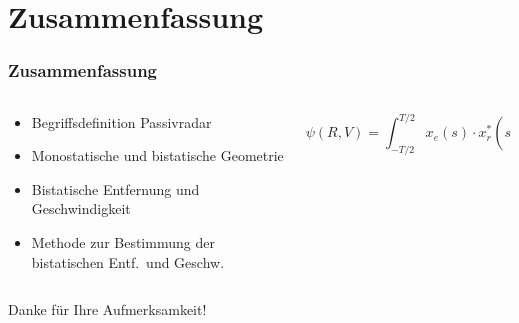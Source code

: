 \section{Zusammenfassung}

\begin{frame}
    \frametitle{Zusammenfassung}

    \begin{columns}
        \begin{column}{0.4\textwidth}
            \begin{itemize}
                \item Begriffsdefinition Passivradar
                \item Monostatische und bistatische Geometrie
                \item Bistatische Entfernung und Geschwindigkeit
                \item Methode zur Bestimmung der bistatischen Entf.\ und Geschw.
            \end{itemize}
        \end{column}
        \begin{column}{0.6\textwidth}
            \centering
            \begin{adjustbox}{max width=\linewidth,max height=0.3\textheight}
            \end{adjustbox}
            \begin{adjustbox}{max width=\linewidth,max height=0.3\textheight}
            \end{adjustbox}
            \begin{adjustbox}{max width=\linewidth,max height=0.25\textheight}
                \begin{tikzpicture}
                    
                \end{tikzpicture}
            \end{adjustbox}
            \tiny\begin{equation}
                \psi(R, V) = \int_{-T/2}^{T/2} {x_{e}(s) \cdot x_{r}^{*}} \left( s - \frac{R}{c} \right)\mathrm{e}^{- \mathrm{j} \frac{2 \pi}{\lambda} V s} \, d s
            \end{equation}\normalsize
        \end{column}
    \end{columns}

    \vspace{\baselineskip}

    \centering
    \huge Danke für Ihre Aufmerksamkeit! \normalsize
\end{frame}
